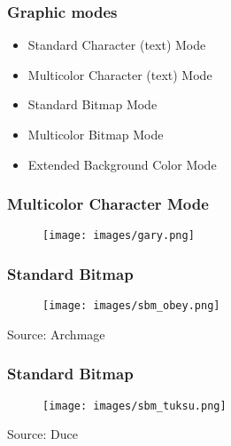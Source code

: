 \documentclass[aspectratio=43]{uva-inf-presentation}
\begin{document}

\begin{frame}
\frametitle{Graphic modes}

\begin{itemize}
\item Standard Character (text) Mode
\item Multicolor Character (text) Mode
\item Standard Bitmap Mode
\item Multicolor Bitmap Mode
\item Extended Background Color Mode
\end{itemize}

\end{frame}


\begin{frame}
\frametitle{Multicolor Character Mode}

\begin{figure}
\texttt{[image: images/gary.png]}
\end{figure}

\end{frame}


\begin{frame}
\frametitle{Standard Bitmap}

\begin{figure}
\texttt{[image: images/sbm\_obey.png]}
\end{figure}

\begin{center}
Source: Archmage
\end{center}

\end{frame}


\begin{frame}
\frametitle{Standard Bitmap}

\begin{figure}
\texttt{[image: images/sbm\_tuksu.png]}
\end{figure}

\begin{center}
Source: Duce
\end{center}

\end{frame}
\end{document}
